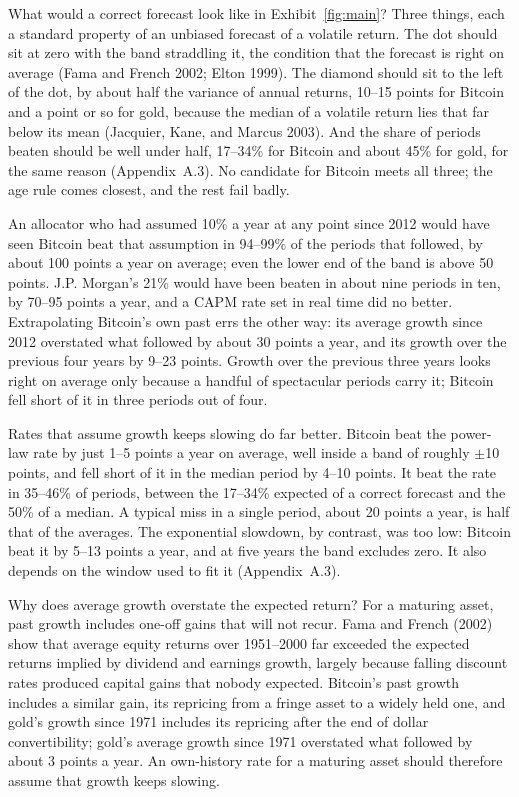 \documentclass[12pt]{article}
\theoremstyle{plain}
\theoremstyle{remark}
\begin{document}
What would a correct forecast look like in Exhibit~\ref{fig:main}? Three things, each a standard property of an unbiased forecast of a volatile return. The dot should sit at zero with the band straddling it, the condition that the forecast is right on average (Fama and French 2002; Elton 1999). The diamond should sit to the left of the dot, by about half the variance of annual returns, 10--15 points for Bitcoin and a point or so for gold, because the median of a volatile return lies that far below its mean (Jacquier, Kane, and Marcus 2003). And the share of periods beaten should be well under half, 17--34\% for Bitcoin and about 45\% for gold, for the same reason (Appendix~A.3). No candidate for Bitcoin meets all three; the age rule comes closest, and the rest fail badly.

An allocator who had assumed 10\% a year at any point since 2012 would have seen Bitcoin beat that assumption in 94--99\% of the periods that followed, by about 100 points a year on average; even the lower end of the band is above 50 points. J.P. Morgan's 21\% would have been beaten in about nine periods in ten, by 70--95 points a year, and a CAPM rate set in real time did no better. Extrapolating Bitcoin's own past errs the other way: its average growth since 2012 overstated what followed by about 30 points a year, and its growth over the previous four years by 9--23 points. Growth over the previous three years looks right on average only because a handful of spectacular periods carry it; Bitcoin fell short of it in three periods out of four.

Rates that assume growth keeps slowing do far better. Bitcoin beat the power-law rate by just 1--5 points a year on average, well inside a band of roughly $\pm$10 points, and fell short of it in the median period by 4--10 points. It beat the rate in 35--46\% of periods, between the 17--34\% expected of a correct forecast and the 50\% of a median. A typical miss in a single period, about 20 points a year, is half that of the averages. The exponential slowdown, by contrast, was too low: Bitcoin beat it by 5--13 points a year, and at five years the band excludes zero. It also depends on the window used to fit it (Appendix~A.3).

Why does average growth overstate the expected return? For a maturing asset, past growth includes one-off gains that will not recur. Fama and French (2002) show that average equity returns over 1951--2000 far exceeded the expected returns implied by dividend and earnings growth, largely because falling discount rates produced capital gains that nobody expected. Bitcoin's past growth includes a similar gain, its repricing from a fringe asset to a widely held one, and gold's growth since 1971 includes its repricing after the end of dollar convertibility; gold's average growth since 1971 overstated what followed by about 3 points a year. An own-history rate for a maturing asset should therefore assume that growth keeps slowing.
\end{document}
